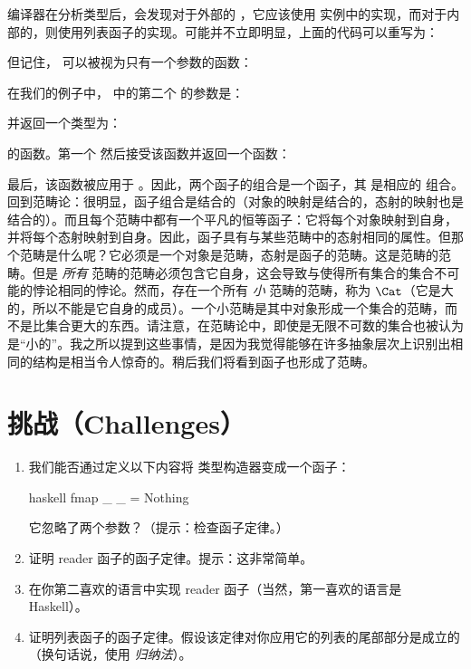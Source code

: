 编译器在分析类型后，会发现对于外部的 ，它应该使用  实例中的实现，而对于内部的，则使用列表函子的实现。可能并不立即明显，上面的代码可以重写为：

但记住， 可以被视为只有一个参数的函数：

在我们的例子中， 中的第二个  的参数是：

并返回一个类型为：

的函数。第一个  然后接受该函数并返回一个函数：

最后，该函数被应用于 。因此，两个函子的组合是一个函子，其  是相应的  组合。回到范畴论：很明显，函子组合是结合的（对象的映射是结合的，态射的映射也是结合的）。而且每个范畴中都有一个平凡的恒等函子：它将每个对象映射到自身，并将每个态射映射到自身。因此，函子具有与某些范畴中的态射相同的属性。但那个范畴是什么呢？它必须是一个对象是范畴，态射是函子的范畴。这是范畴的范畴。但是 \emph{所有} 范畴的范畴必须包含它自身，这会导致与使得所有集合的集合不可能的悖论相同的悖论。然而，存在一个所有 \emph{小} 范畴的范畴，称为 $\Cat$（它是大的，所以不能是它自身的成员）。一个小范畴是其中对象形成一个集合的范畴，而不是比集合更大的东西。请注意，在范畴论中，即使是无限不可数的集合也被认为是“小的”。我之所以提到这些事情，是因为我觉得能够在许多抽象层次上识别出相同的结构是相当令人惊奇的。稍后我们将看到函子也形成了范畴。

\section{挑战（Challenges）}

\begin{enumerate}
  \tightlist
  \item
  我们能否通过定义以下内容将  类型构造器变成一个函子：

  \begin{snip}{haskell}
    fmap _ _ = Nothing
  \end{snip}

  它忽略了两个参数？（提示：检查函子定律。）
  \item
  证明 reader 函子的函子定律。提示：这非常简单。
  \item
  在你第二喜欢的语言中实现 reader 函子（当然，第一喜欢的语言是 Haskell）。
  \item
  证明列表函子的函子定律。假设该定律对你应用它的列表的尾部部分是成立的（换句话说，使用 \emph{归纳法}）。
\end{enumerate}
